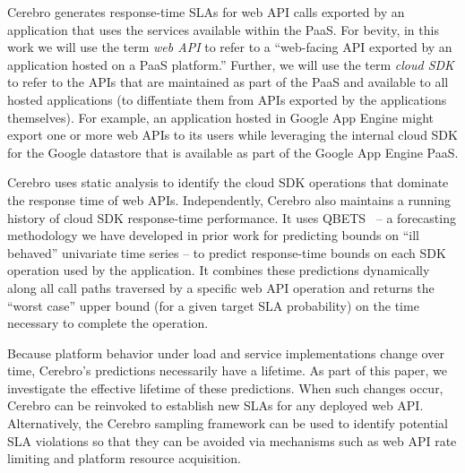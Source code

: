Cerebro generates response-time SLAs for web API calls exported by an application
that uses the services available within the PaaS.  For bevity, in this work
we will use the
term \textit{web API} to refer to a ``web-facing API exported by an
application hosted on a PaaS platform.'' Further, 
we will use the term \textit{cloud
SDK} to refer to the APIs that are maintained as part of the PaaS and
available to all hosted applications
(to diffentiate them from APIs exported by the applications themselves).   
For example, an application hosted in Google App Engine might export one or
more web APIs to its users while leveraging the internal cloud SDK for the
Google datastore that is available as part of the Google App Engine PaaS.

Cerebro uses static analysis to identify the cloud SDK operations
that dominate the response time of web APIs.  Independently,
Cerebro also maintains a running history of cloud SDK response-time 
performance.  It uses
QBETS~\cite{Nurmi:2007:QQB:1791551.1791556} -- a forecasting methodology
we have developed in prior work for predicting bounds on ``ill behaved''   
univariate time series -- to predict response-time bounds on each SDK
operation used by the application.  It combines these predictions dynamically
along all call paths traversed by a specific web API operation
and returns the ``worst case''
upper bound (for a given target SLA probability) on the time necessary to 
complete the operation.


Because platform behavior under load and service implementations change over time,
Cerebro's predictions necessarily have a lifetime.  
As part of this paper, we investigate
the effective lifetime of these predictions.  When such changes occur,
Cerebro can be reinvoked to establish new SLAs for any deployed web API.  Alternatively,
the Cerebro sampling framework can be used to identify potential SLA violations
so that they can be avoided via mechanisms such 
as web API rate limiting and platform resource acquisition.

